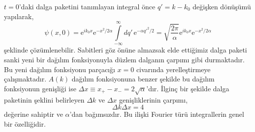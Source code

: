 \documentclass[a4paper,12pt, twoside]{article}
\begin{document}
$t=0$'daki dalga paketini tanımlayan integral önce $q' = k-k_0$ değişken dönüşümü yapılarak,
\begin{equation}
\psi(x, 0) = \text{e}^{ik_0x} \text{e}^{-x^2/2\alpha} \int\limits_{-\infty}^{\infty}dq' \, \text{e}^{-\alpha q'^2/2} = \sqrt{\frac{2\pi}{\alpha}} \text{e}^{ik_0x} \text{e}^{-x^2/2\alpha}
\label{eq:wave_packet_t0}
\end{equation}
şeklinde çözümlenebilir. Sabitleri göz önüne almazsak elde ettiğimiz dalga paketi sanki yeni bir dağılım fonksiyonuyla düzlem dalganın çarpımı gibi durmaktadır. Bu yeni dağılım fonksiyonu parçacığı $x=0$ civarında yerelleştirmeye çalışmaktadır. $A(k)$ dağılım fonksiyonuna benzer şekilde bu dağılım fonksiyonun genişliği ise $\Delta x \equiv  x_{+} - x_{-} = 2\sqrt{\alpha}$'dır. İlginç bir şekilde dalga paketinin şeklini belirleyen $\Delta k$ ve $\Delta x$ genişliklerinin çarpımı,
\begin{equation}
\Delta k  \Delta x  = 4
\label{eq:del_x_k}
\end{equation}
değerine sahiptir ve $\alpha$'dan bağımsızdır. Bu ilişki Fourier türü integrallerin genel bir özelliğidir.
\end{document}
